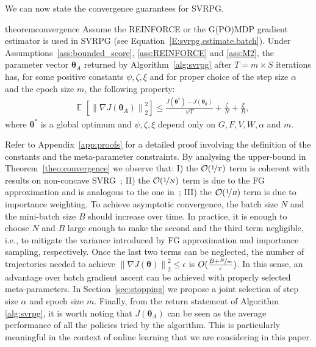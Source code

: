 \documentclass{article}
\makeatletter
\theoremstyle{remark}
\theoremstyle{definition}
\DeclareRobustCommand{\eg}{e.g.,\@\xspace}
\DeclareRobustCommand{\ie}{i.e.,\@\xspace}
\DeclareMathOperator*{\EV}{\mathbb{E}}
\newcommand{\EVV}[2][\ppvect \in \ppspace]{\EV_{#1}\left[{#2}\right]}
\newcommand{\norm}[2][\infty]{\left\|#2\right\|_{#1}}
\newcommand{\vtheta}{\boldsymbol{\theta}}
\newcommand{\gradJ}[1]{\nabla J(#1)}
\newcommand{\VARRF}{V}
\newcommand{\GRADLOG}{G}
\newcommand{\VARIS}{W}
\newcommand{\HESSLOG}{F}
\makeatother
\begin{document}
We can now state the convergence guarantees for SVRPG.
\begin{restatable}{theorem}{convergence}\label{theo:convergence}
Assume the REINFORCE or the G(PO)MDP gradient estimator is used in SVRPG (see Equation~\eqref{E:svrpg.estimate.batch}).
Under Assumptions~\ref{ass:bounded_score}, \ref{ass:REINFORCE} and \ref{ass:M2}, the parameter vector $\vtheta_A$ returned by Algorithm~\ref{alg:svrpg} after $T=m\times S$ iterations has, for some positive constants $\psi,\zeta, \xi$ and for proper choice of the step size $\alpha$ and the epoch size $m$, the following property:
\begin{align*}
	&\EVV[]
	{\norm[2]{\nabla J(\vtheta_A)}^2} 
		\leq
		\frac{J(\vtheta^*)-J(\vtheta_0)}{\psi T} +
		\frac{\zeta}{N}
		+\frac{\xi}{B},
\end{align*}
where $\vtheta^*$ is a global optimum and $\psi,\zeta,\xi$ depend only on $\GRADLOG,\HESSLOG,\VARRF,\VARIS,\alpha$ and $m$.
\end{restatable}
Refer to Appendix~\ref{app:proofs} for a detailed proof involving the definition of the constants and the meta-parameter constraints.
By analysing the upper-bound in Theorem~\ref{theo:convergence} we observe that: I) the $\mathcal{O}(\nicefrac{1}{T})$ term is coherent with results on non-concave SVRG~\citep[\eg][]{reddi2016stochastic}; II) the $\mathcal{O}(\nicefrac{1}{N})$ term is due to the FG approximation and is analogous to the one in~\citep{harikandeh2015stopwasting}; III) the $\mathcal{O}(\nicefrac{1}{B})$ term is due to importance weighting.
To achieve asymptotic convergence, the batch size $N$ and the mini-batch size $B$ should increase over time. 
In practice, it is enough to choose $N$ and $B$ large enough to make the second and the third term negligible, \ie to mitigate the variance introduced by FG approximation and importance sampling, respectively.
Once the last two terms can be neglected, the number of trajectories needed to achieve $\norm[2]{\gradJ{\vtheta}}^2\leq\epsilon$ is $O(\frac{B+\nicefrac{N}{m}}{\epsilon})$. In this sense, an advantage over batch gradient ascent can be achieved with properly selected meta-parameters. In Section~\ref{sec:stopping} we propose a joint selection of step size $\alpha$ and epoch size $m$.
Finally, from the return statement of Algorithm \ref{alg:svrpg}, it is worth noting that $J(\vtheta_A)$ can be seen as the average performance of all the policies tried by the algorithm. This is particularly meaningful in the context of online learning that we are considering in this paper.
\end{document}
